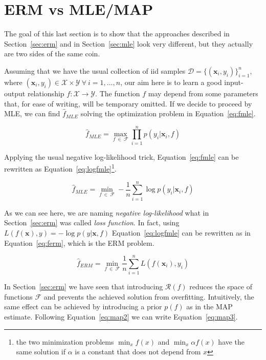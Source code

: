 \section{ERM vs MLE/MAP} \label{sec:erm-mlemap_connection}
The goal of this last section is to show that the approaches described in Section~\ref{sec:erm} and in Section~\ref{sec:mle} look very different, but they actually are two sides of the same coin.

Assuming that we have the usual collection of \ac{iid} samples $\mathcal{D}=\{(\bm{x}_i,y_i)\}_{i=1}^n$, where $(\bm{x}_i,y_i) \in \mathcal{X} \times \mathcal{Y}~\forall~i=1,\dots,n$, our aim here is to learn a good input-output relationship $f: \mathcal{X} \rightarrow \mathcal{Y}$. The function $f$ may depend from some parameters that, for ease of writing, will be temporary omitted. If we decide to proceed by MLE, we can find $\hat f_{MLE}$ solving the optimization problem in Equation~\eqref{eq:fmle}.

\begin{equation} \label{eq:fmle}
	\hat f_{MLE} = \max_{f~\in~\mathcal{F}} \prod_{i=1}^n p(y_i|\bm{x}_i,f)
\end{equation}

Applying the usual negative log-likelihood trick, Equation~\eqref{eq:fmle} can be rewritten as Equation~\eqref{eq:logfmle}\footnote{the two minimization problems $\min_x f(x)$ and $\min_x \alpha f(x)$ have the same solution if $\alpha$ is a constant that does not depend from $x$}.

\begin{equation} \label{eq:logfmle}
	\hat f_{MLE} = \min_{f~\in~\mathcal{F}} - \frac{1}{n} \sum_{i=1}^n \log p(y_i|\bm{x}_i,f)
\end{equation}

As we can see here, we are naming \textit{negative log-likelihood} what in Section~\ref{sec:erm} was called \textit{loss function}. In fact, using $L(f(\bm{x}), y) = -\log p(y|\bm{x}, f)$ Equation~\eqref{eq:logfmle} can be rewritten as in Equation~\eqref{eq:ferm}, which is the ERM problem.

\begin{equation} \label{eq:ferm}
	\hat f_{ERM} = \min_{f~\in~\mathcal{F}} \frac{1}{n} \sum_{i=1}^n L(f(\bm{x}_i), y_i)
\end{equation}

In Section~\ref{sec:erm} we have seen that introducing $\mathcal{R}(f)$ reduces the space of functions $\mathcal{F}$ and prevents the achieved solution from overfitting. Intuitively, the same effect can be achieved by introducing a prior $p(f)$ as in the MAP estimate. Following Equation~\eqref{eq:map2} we can write Equation~\eqref{eq:map3}.

